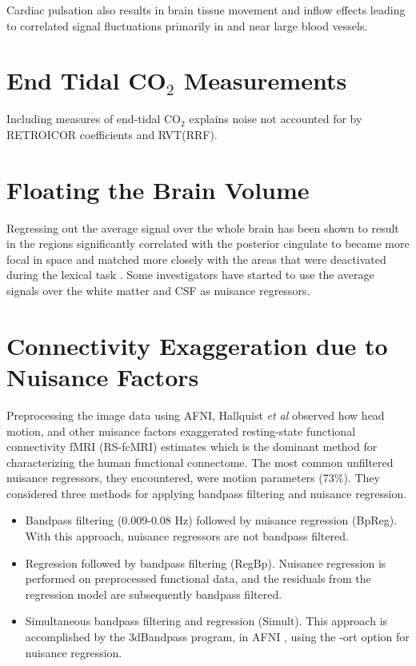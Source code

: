 \documentclass[twoside,twocolumn]{article}
\begin{document}
Cardiac pulsation also results in brain tissue movement and inﬂow effects leading to correlated signal ﬂuctuations primarily in and near large blood vessels\cite{Dagli1999}.

\section{End Tidal CO$_2$ Measurements}

Including measures of end-tidal CO$_2$ explains noise not accounted for by RETROICOR coefficients and RVT(RRF)\cite{Birn2012}.

\section{Floating the Brain Volume}

Regressing out the average signal over the whole brain has been shown to result in the regions signiﬁcantly correlated with the posterior cingulate to became more focal in space and matched more closely with the areas that were deactivated during the lexical task \cite{Birn2012}.  Some investigators have started to use the average signals over the white matter and CSF as nuisance regressors\cite{Birn2012}. 

\section{Connectivity Exaggeration due to Nuisance Factors}

Preprocessing the image data using AFNI\cite{Cox1996}, Hallquist {\em et al}\cite{Hallquist2013} observed how head motion, and other nuisance factors exaggerated resting-state functional connectivity fMRI (RS-fcMRI) estimates which is the dominant method for characterizing the human functional connectome.  The most common unﬁltered nuisance regressors, they encountered, were motion parameters (73\%).  They considered three methods for applying bandpass filtering and nuisance regression.
\begin{itemize}
	\item Bandpass ﬁltering (0.009-0.08 Hz) followed by nuisance regression (BpReg).  With this approach, nuisance regressors are not bandpass ﬁltered.
	\item Regression followed by bandpass ﬁltering (RegBp).  Nuisance regression is performed on preprocessed functional data, and the residuals from the regression model are subsequently bandpass ﬁltered.
	\item Simultaneous bandpass ﬁltering and regression (Simult).  This approach is accomplished by the 3dBandpass program, in AFNI \cite{Cox1996}, using the -ort option for nuisance regression.
\end{itemize}
\end{document}
